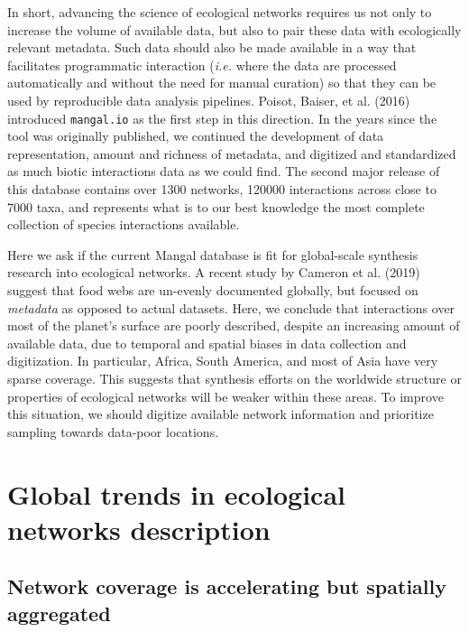 \documentclass[10pt,oneside]{article}
\begin{document}
In short, advancing the science of ecological networks requires us not
only to increase the volume of available data, but also to pair these
data with ecologically relevant metadata. Such data should also be made
available in a way that facilitates programmatic interaction
(\emph{i.e.} where the data are processed automatically and without the
need for manual curation) so that they can be used by reproducible data
analysis pipelines. Poisot, Baiser, et al. (2016) introduced
\texttt{mangal.io} as the first step in this direction. In the years
since the tool was originally published, we continued the development of
data representation, amount and richness of metadata, and digitized and
standardized as much biotic interactions data as we could find. The
second major release of this database contains over 1300 networks,
120000 interactions across close to 7000 taxa, and represents what is to
our best knowledge the most complete collection of species interactions
available.

Here we ask if the current Mangal database is fit for global-scale
synthesis research into ecological networks. A recent study by Cameron
et al. (2019) suggest that food webs are un-evenly documented globally,
but focused on \emph{metadata} as opposed to actual datasets. Here, we
conclude that interactions over most of the planet's surface are poorly
described, despite an increasing amount of available data, due to
temporal and spatial biases in data collection and digitization. In
particular, Africa, South America, and most of Asia have very sparse
coverage. This suggests that synthesis efforts on the worldwide
structure or properties of ecological networks will be weaker within
these areas. To improve this situation, we should digitize available
network information and prioritize sampling towards data-poor locations.

\hypertarget{global-trends-in-ecological-networks-description}{%
\section{Global trends in ecological networks
description}\label{global-trends-in-ecological-networks-description}}

\hypertarget{network-coverage-is-accelerating-but-spatially-aggregated}{%
\subsection{Network coverage is accelerating but spatially
aggregated}\label{network-coverage-is-accelerating-but-spatially-aggregated}}
\end{document}
